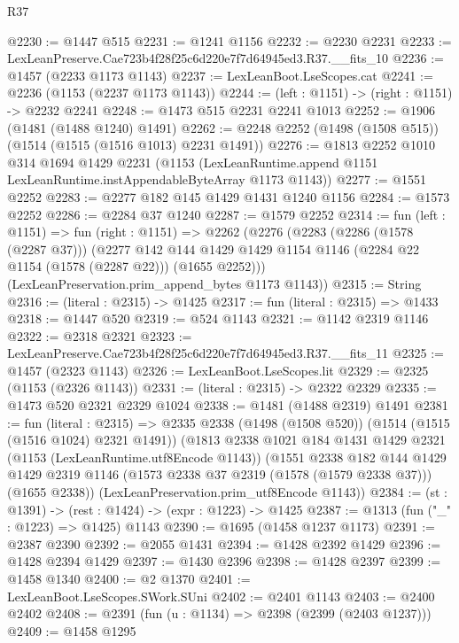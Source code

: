 \begin{lexlean}{R37}
\begin{coremodule}
@2230 := @1447 @515
@2231 := @1241 @1156
@2232 := @2230 @2231
@2233 := LexLeanPreserve.Cae723b4f28f25c6d220e7f7d64945ed3.R37.__fits_10
@2236 := @1457 (@2233 @1173 @1143)
@2237 := LexLeanBoot.LseScopes.cat
@2241 := @2236 (@1153 (@2237 @1173 @1143))
@2244 := (left : @1151) -> (right : @1151) -> @2232 @2241
@2248 := @1473 @515 @2231 @2241 @1013
@2252 := @1906 (@1481 (@1488 @1240) @1491)
@2262 := @2248 @2252 (@1498 (@1508 @515)) (@1514 (@1515 (@1516 @1013) @2231 @1491))
@2276 := @1813
    @2252
    @1010
    @314
    @1694
    @1429
    @2231
    (@1153 (LexLeanRuntime.append @1151 LexLeanRuntime.instAppendableByteArray @1173 @1143))
@2277 := @1551 @2252
@2283 := @2277 @182 @145 @1429 @1431 @1240 @1156
@2284 := @1573 @2252
@2286 := @2284 @37 @1240
@2287 := @1579 @2252
@2314 := fun (left : @1151) =>
  fun (right : @1151) =>
  @2262
    (@2276
      (@2283
        (@2286 (@1578 (@2287 @37)))
        (@2277
          @142
          @144
          @1429
          @1429
          @1154
          @1146
          (@2284 @22 @1154 (@1578 (@2287 @22)))
          (@1655 @2252)))
      (LexLeanPreservation.prim_append_bytes @1173 @1143))
@2315 := String
@2316 := (literal : @2315) -> @1425
@2317 := fun (literal : @2315) => @1433
@2318 := @1447 @520
@2319 := @524 @1143
@2321 := @1142 @2319 @1146
@2322 := @2318 @2321
@2323 := LexLeanPreserve.Cae723b4f28f25c6d220e7f7d64945ed3.R37.__fits_11
@2325 := @1457 (@2323 @1143)
@2326 := LexLeanBoot.LseScopes.lit
@2329 := @2325 (@1153 (@2326 @1143))
@2331 := (literal : @2315) -> @2322 @2329
@2335 := @1473 @520 @2321 @2329 @1024
@2338 := @1481 (@1488 @2319) @1491
@2381 := fun (literal : @2315) =>
  @2335
    @2338
    (@1498 (@1508 @520))
    (@1514 (@1515 (@1516 @1024) @2321 @1491))
    (@1813
      @2338
      @1021
      @184
      @1431
      @1429
      @2321
      (@1153 (LexLeanRuntime.utf8Encode @1143))
      (@1551
        @2338
        @182
        @144
        @1429
        @1429
        @2319
        @1146
        (@1573 @2338 @37 @2319 (@1578 (@1579 @2338 @37)))
        (@1655 @2338))
      (LexLeanPreservation.prim_utf8Encode @1143))
@2384 := (st : @1391) -> (rest : @1424) -> (expr : @1223) -> @1425
@2387 := @1313 (fun ("_" : @1223) => @1425) @1143
@2390 := @1695 (@1458 @1237 @1173)
@2391 := @2387 @2390
@2392 := @2055 @1431
@2394 := @1428 @2392 @1429
@2396 := @1428 @2394 @1429
@2397 := @1430 @2396
@2398 := @1428 @2397
@2399 := @1458 @1340
@2400 := @2 @1370
@2401 := LexLeanBoot.LseScopes.SWork.SUni
@2402 := @2401 @1143
@2403 := @2400 @2402
@2408 := @2391 (fun (u : @1134) => @2398 (@2399 (@2403 @1237)))
@2409 := @1458 @1295

\end{coremodule}
\end{lexlean}
